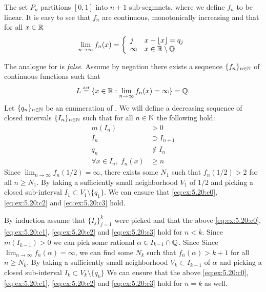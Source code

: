 \begin{enumerate}
\begin{itemize}
The set \(P_n\) partitions \([0,1]\)
into \(n+1\) sub-segmnets, where we define \(f_n\) to be linear.
It is easy to see that \(f_n\) are continuous, monotonically increasing
and that for all \(x\in\mathbb{R}\)
\begin{equation*}
\lim_{n\to\infty} f_n(x) = 
\left\{\begin{array}{ll}
       j       & x - \lfloor x \rfloor = q_j \\
       \infty  &   x \in \mathbb{R}\setminus \mathbb{Q}
       \end{array}\right.
\end{equation*}




The analogue for  is \emph{false}.
Assume by negation there exists a sequence \(\{f_n\}_{n\in\mathbb{N}}\)
of continuous functions such that 
\begin{equation*}
L \stackrel{\mbox{\upshape\tiny def}}{=} \{x\in\mathbb{R}: \lim_{n\to\infty} f_n(x) = \infty\} = \mathbb{Q}.
\end{equation*}
Let \(\{q_n\}_{n\in\mathbb{N}}\) be an enumeration of \Q.
We will define a decreasing sequence of closed intervals
\(\{I_n\}_{n\in\mathbb{N}}\) such that 
for all \(n\in\mathbb{N}\)
the following hold:
\begin{align}
m(I_n) &> 0  \label{eq:ex:5.20:c0} \\
I_n &\supset I_{n+1} \label{eq:ex:5.20:c1} \\
q_n &\notin I_n \label{eq:ex:5.20:c2} \\
\forall x \in I_n,\; f_n(x) &\geq n \label{eq:ex:5.20:c3}
\end{align}
Since \(\lim_{n\to\infty} f_n(1/2)=\infty\), 
there exists some \(N_1\) such that 
\(f_n(1/2) > 2\) for all \(n\geq N_1\).
By taking a sufficiently small neighborhood \(V_1\) of \(1/2\)
and picking a closed sub-interval \(I_1 \subset V_1 \setminus \{q_1\}\).
We can ensure that 
\eqref{eq:ex:5.20:c0},
\eqref{eq:ex:5.20:c2} and
\eqref{eq:ex:5.20:c3} hold.

By induction assume that 
\(\{I_j\}_{j=1}^k\) were picked and that
the above 
\eqref{eq:ex:5.20:c0},
\eqref{eq:ex:5.20:c1},
\eqref{eq:ex:5.20:c2} and
\eqref{eq:ex:5.20:c3} hold for \(n< k\).
Since \(m(I_{k-1})>0\) we can
pick some rational \(\alpha \in I_{k-1} \cap \mathbb{Q}\).
Since 
Since \(\lim_{n\to\infty} f_n(\alpha)=\infty\), 
we can find some \(N_k\) such that 
\(f_n(\alpha) > k+1\) for all \(n\geq N_k\).
By taking a sufficiently small neighborhood \(V_k\subset I_{k-1}\) 
of \(\alpha\)
and picking a closed sub-interval \(I_k\subset V_k \setminus \{q_k\}\)
We can ensure that the above 
\eqref{eq:ex:5.20:c0},
\eqref{eq:ex:5.20:c1},
\eqref{eq:ex:5.20:c2} and
\eqref{eq:ex:5.20:c3} hold for \(n=k\) as well.


\end{itemize}
\end{enumerate}
